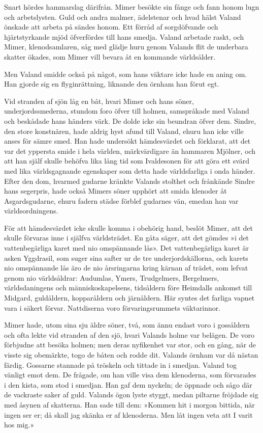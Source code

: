 Snart hördes hammarslag därifrån. Mimer besökte sin fånge och fann honom
lugn och arbetslysten. Guld och andra malmer, ädelstenar och hvad hälst
Valand önskade att arbeta på sändes honom. Ett förråd af sorgdöfvande
och hjärtstyrkande mjöd öfverfördes till hans smedja. Valand arbetade
raskt, och Mimer, klenodsamlaren, såg med glädje huru genom Valands flit
de underbara skatter ökades, som Mimer vill bevara åt en kommande
världsålder.

Men Valand smidde också på något, som hans väktare icke hade en aning
om. Han gjorde sig en flyginrättning, liknande den örnham han förut egt.

Vid stranden af sjön låg en båt, hvari Mimer och hans söner,
underjordssmederna, stundom foro öfver till holmen, samspråkade med
Valand och beskådade hans händers värk. De dolde icke sin beundran öfver
dem. Sindre, den store konstnären, hade aldrig hyst afund till Valand,
ehuru han
icke ville anses för sämre smed. Han hade undersökt hämdesvärdet och
förklarat, att det var det yppersta smide i hela världen, märkvärdigare
än hammaren Mjölner, och att han själf skulle behöfva lika lång tid som
Ivaldesonen för att göra ett svärd med lika världsgagnande egenskaper
som detta hade världsfarliga i onda händer. Efter den dom, hvarmed
gudarne kränkte Valands stolthet och frånkände Sindre hans segerpris,
hade också Mimers söner upphört att smida klenoder åt Asgardsgudarne,
ehuru fadern städse förblef gudarnes vän, emedan han var
världsordningens.

För att hämdesvärdet icke skulle komma i obehörig hand, beslöt Mimer,
att det skulle förvaras inne i själfva världsträdet. En gåta säger, att
det gömdes »i det vattenbegärliga karet med nio omspännande lås». Det
vattenbegärliga karet är asken Yggdrasil, som suger sina safter ur de
tre underjordskällorna, och karets nio omspännande lås äro de nio
årsringarna kring kärnan af trädet, som lefvat genom nio världsåldrar:
Audumlas, Ymers, Trudgelmers, Bergelmers, världsdaningens och
människoskapelsens, tidsåldern före Heimdalls ankomst till Midgard,
guldåldern, kopparåldern och järnåldern. Här syntes det farliga vapnet
vara i säkert förvar. Nattdiserna voro förvaringsrummets väktarinnor.

Mimer hade, utom sina sju äldre söner, två, som ännu endast voro i
gossåldern och ofta lekte vid stranden af den sjö, hvari Valands holme
var belägen. De voro förbjudne att besöka holmen; men deras nyfikenhet
var stor, och en gång, när de visste sig obemärkte, togo de båten och
rodde dit. Valands örnham var då nästan färdig. Gossarne stannade på
tröskeln och tittade in i smedjan. Valand tog vänligt emot dem. De
frågade, om han ville visa dem klenoderna, som förvarades i den kista,
som stod i smedjan. Han gaf dem nyckeln; de öppnade och sågo där de
vackraste saker af guld. Valands ögon lyste styggt, medan piltarne
fröjdade sig med åsynen af skatterna. Han sade till dem: »Kommen hit i
morgon bittida, när ingen ser er; då skall jag skänka er af klenoderna.
Men låt ingen veta att I varit hos mig.»

